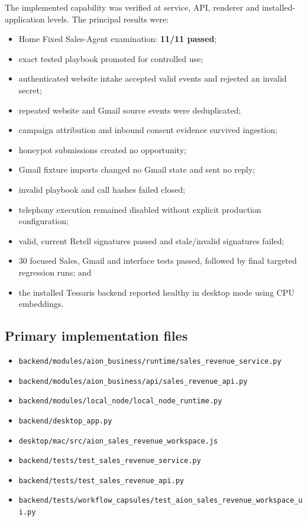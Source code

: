 The implemented capability was verified at service, API, renderer and installed-application levels. The principal results were:

\begin{itemize}[leftmargin=*]
    \item Home Fixed Sales-Agent examination: \textbf{11/11 passed};
    \item exact tested playbook promoted for controlled use;
    \item authenticated website intake accepted valid events and rejected an invalid secret;
    \item repeated website and Gmail source events were deduplicated;
    \item campaign attribution and inbound consent evidence survived ingestion;
    \item honeypot submissions created no opportunity;
    \item Gmail fixture imports changed no Gmail state and sent no reply;
    \item invalid playbook and call hashes failed closed;
    \item telephony execution remained disabled without explicit production configuration;
    \item valid, current Retell signatures passed and stale/invalid signatures failed;
    \item 30 focused Sales, Gmail and interface tests passed, followed by final targeted regression runs; and
    \item the installed Tessaris backend reported healthy in desktop mode using CPU embeddings.
\end{itemize}

\subsection{Primary implementation files}

\begin{itemize}[leftmargin=*]
    \item \texttt{backend/modules/aion\_business/runtime/sales\_revenue\_service.py}
    \item \texttt{backend/modules/aion\_business/api/sales\_revenue\_api.py}
    \item \texttt{backend/modules/local\_node/local\_node\_runtime.py}
    \item \texttt{backend/desktop\_app.py}
    \item \texttt{desktop/mac/src/aion\_sales\_revenue\_workspace.js}
    \item \texttt{backend/tests/test\_sales\_revenue\_service.py}
    \item \texttt{backend/tests/test\_sales\_revenue\_api.py}
    \item \texttt{backend/tests/workflow\_capsules/test\_aion\_sales\_revenue\_workspace\_ui.py}
\end{itemize}

